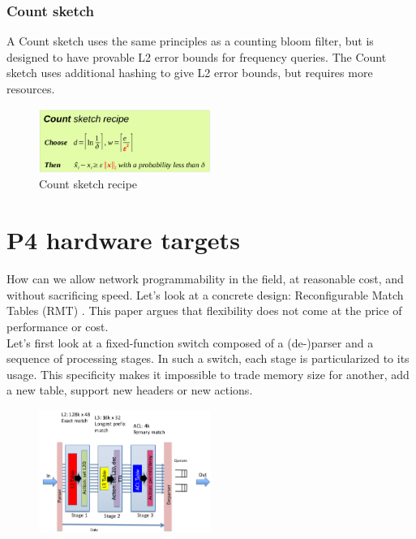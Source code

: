 \documentclass[11pt,oneside,a4paper]{article}
\begin{document}
\subsubsection{Count sketch}

A Count sketch uses the same principles as a counting bloom filter, but is designed to have provable L2 error bounds for frequency queries. The Count sketch uses additional hashing to give L2 error bounds, but requires more resources.

\begin{figure}[hb]
	\centering
	\includegraphics[width=0.5\textwidth,scale=1]{figures/countsketch_recipe}
	\caption{Count sketch recipe \cite{advnet}}
	\label{fig:countsketch_recipe}
\end{figure}

\newpage

\section{P4 hardware targets}

How can we allow network programmability in the field, at reasonable cost, and without sacrificing speed. Let's look at a concrete design: Reconfigurable Match Tables (RMT) \cite{rmt}. This paper argues that flexibility does not come at the price of performance or cost.\\
Let's first look at a fixed-function switch composed of a (de-)parser and a sequence of processing stages. In such a switch, each stage is particularized to its usage. This specificity makes it impossible to trade memory size for another, add a new table, support new headers or new actions.

\begin{figure}[hb]
	\centering
	\includegraphics[width=0.5\textwidth,scale=1]{figures/fixed_function_switch}
	\label{fig:fixed_function_switch}
\end{figure}
\end{document}
